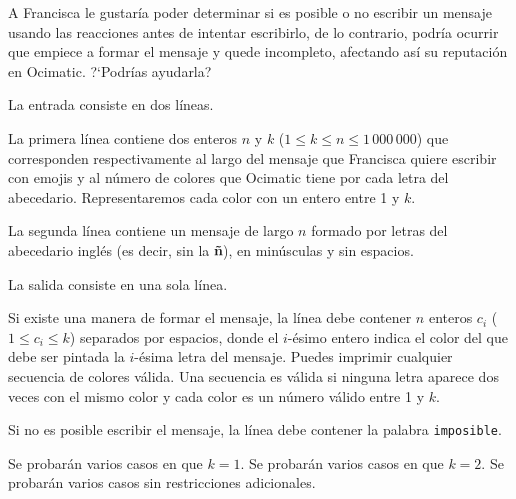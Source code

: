 \documentclass{oci}
\newcommand{\platform}{Ocimatic}
\newcommand{\hero}{Francisca}
\begin{document}
\begin{problemDescription}
A \hero{} le gustaría poder determinar si es posible o no escribir un mensaje
usando las reacciones antes de intentar escribirlo, de lo contrario,
podría ocurrir que empiece a formar el mensaje y quede incompleto, afectando
así su reputación en \platform{}.
%
?`Podrías ayudarla?

\end{problemDescription}

\begin{inputDescription}
La entrada consiste en dos líneas.

La primera línea contiene dos enteros $n$ y $k$ ($1 \le k \le n \le 1\,000\,000$)
que corresponden respectivamente al largo del mensaje que \hero{} quiere escribir
con emojis y al número de colores que \platform{} tiene por cada letra del abecedario.
%
Representaremos cada color con un entero entre 1 y $k$.

La segunda línea contiene un mensaje de largo $n$ formado por letras del abecedario
inglés (es decir, sin la \textbf{ñ}), en minúsculas y sin espacios.
\end{inputDescription}

\begin{outputDescription}
La salida consiste en una sola línea.

Si existe una manera de formar el mensaje, la línea debe contener $n$
enteros $c_i$ ($1 \le c_i \le k$) separados por espacios,
donde el $i$-ésimo entero indica el color del que debe ser pintada la $i$-ésima
letra del mensaje.
%
Puedes imprimir cualquier secuencia de colores válida.
%
Una secuencia es válida si ninguna letra aparece dos veces con el
mismo color y cada color es un número válido entre 1 y $k$.

Si no es posible escribir el mensaje, la línea debe contener la palabra \texttt{imposible}.
\end{outputDescription}

\begin{scoreDescription}
  Se probarán varios casos en que $k = 1$.
  Se probarán varios casos en que $k = 2$.
  Se probarán varios casos sin restricciones adicionales.
\end{scoreDescription}

\begin{sampleDescription}
\end{sampleDescription}
\end{document}
